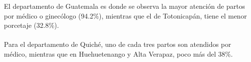  El departamento de Guatemala  es donde se observa la mayor atención de partos por médico o ginecólogo (94.2\%), mientras que  el de Totonicapán, tiene el menor porcetaje (32.8\%).\\\\ 
Para el departamento de Quiché, uno de cada tres partos son atendidos por médico, mientras que en Huehuetenango y Alta Verapaz, poco más del 38\%.